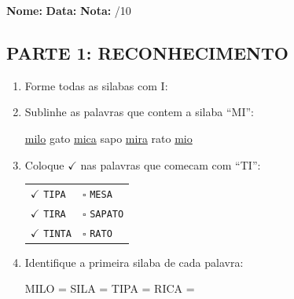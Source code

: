 \begin{exercicio}
\noindent\textbf{Nome:} \underline{\hspace{3.2cm}} \quad \textbf{Data:} \underline{\hspace{1.6cm}} \quad \textbf{Nota:} \underline{\hspace{0.9cm}}/10

\subsection*{PARTE 1: RECONHECIMENTO}

\begin{enumerate}
  \item Forme todas as silabas com I:
  \begin{center}
  \end{center}

  \item Sublinhe as palavras que contem a silaba ``MI'':
  \begin{center}
  \uline{milo} \quad gato \quad \uline{mica} \quad sapo \quad \uline{mira} \quad rato \quad \uline{mio}
  \end{center}

  \item Coloque $\checkmark$ nas palavras que comecam com ``TI'':
  \begin{center}
  \begin{tabular}{ll}
  $\checkmark$ \texttt{TIPA} & $\square$ \texttt{MESA} \\
  $\checkmark$ \texttt{TIRA} & $\square$ \texttt{SAPATO} \\
  $\checkmark$ \texttt{TINTA} & $\square$ \texttt{RATO}
  \end{tabular}
  \end{center}

  \item Identifique a primeira silaba de cada palavra:
  \begin{center}
  MILO = \underline{\hspace{1cm}} \quad SILA = \underline{\hspace{1cm}} \quad TIPA = \underline{\hspace{1cm}} \quad RICA = \underline{\hspace{1cm}}
  \end{center}


\end{enumerate}
\end{exercicio}
